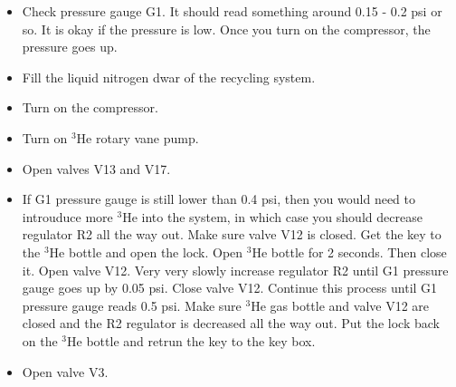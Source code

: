 \documentclass{article}
\begin{document}
\begin{itemize}
  \item Check pressure gauge G1. It should read something around 0.15 - 0.2 psi or so. It is okay if the pressure is low. Once you turn on the compressor, the pressure goes up.
  \item Fill the liquid nitrogen dwar of the recycling system.
  \item Turn on the compressor.
  \item Turn on $^{3}$He rotary vane pump.
  \item Open valves V13 and V17.
  \item If G1 pressure gauge is still lower than 0.4 psi, then you would need to introuduce more $^{3}$He into the system, in which case you should decrease regulator R2 all the way out. Make sure valve V12 is closed. Get the key to the $^{3}$He bottle and open the lock. Open $^{3}$He bottle for 2 seconds. Then close it. Open valve V12. Very very slowly increase regulator R2 until G1 pressure gauge goes up by 0.05 psi. Close valve V12. Continue this process until G1 pressure gauge reads 0.5 psi. Make sure $^{3}$He gas bottle and valve V12 are closed and the R2 regulator is decreased all the way out. Put the lock back on the $^{3}$He bottle and retrun the key to the key box.
  \item Open valve V3.

\end{itemize}
\end{document}
